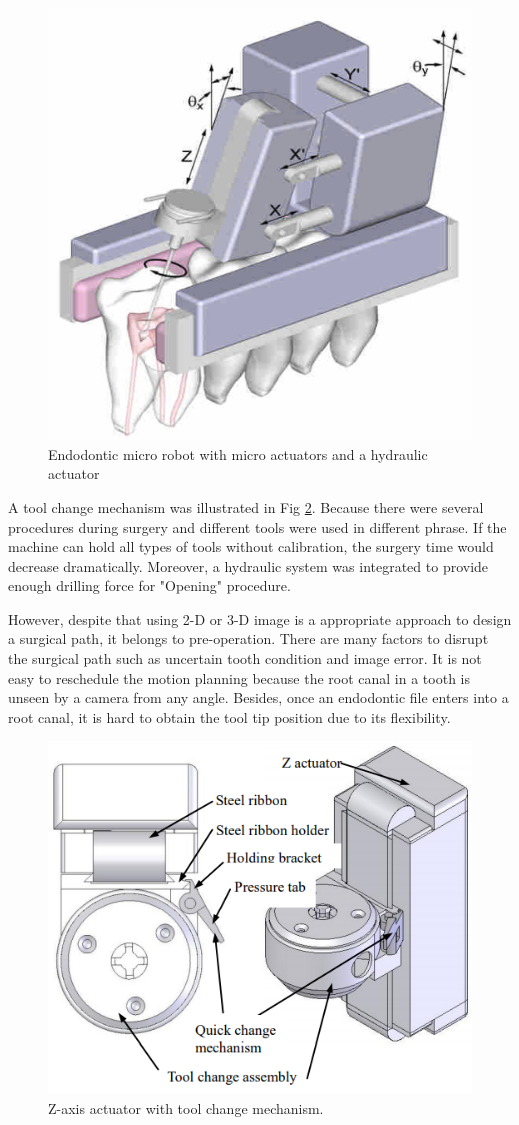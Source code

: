 \begin{figure}[htbp]
\begin{center}
	\includegraphics[width=0.6\linewidth]{Images/NCTU_1.png}
	\caption[Endodontic micro robot with micro actuators, a tool change mechanism, and a hydraulic system]{
Endodontic micro robot with micro actuators and a hydraulic actuator \cite{dong2006wip}
}\label{fig:NCTU_1}
\end{center}
\end{figure}
\par
A tool change mechanism was illustrated in Fig \ref{fig:NCTU_3}. Because there were several procedures during surgery and different tools were used in different phrase. If the machine can hold all types of tools without calibration, the surgery time would decrease dramatically.  Moreover, a hydraulic system was integrated to provide enough drilling force for "Opening" procedure.
\par
However, despite that using 2-D or 3-D image is a appropriate approach to design a surgical path, it belongs to pre-operation. There are many factors to disrupt the surgical path such as uncertain tooth condition and image error. It is not easy to reschedule the motion planning because the root canal in a tooth is unseen by a camera from any angle. Besides, once an endodontic file enters into a root canal, it is hard to obtain the tool tip position due to its flexibility. 
\begin{figure}[htbp]
\begin{center}
\includegraphics[width=0.7\linewidth]{Images/NCTU_3.png}
\caption[Z-axis actuator with tool change mechanism.]{
Z-axis actuator with tool change mechanism. \cite{dong2010design}
}\label{fig:NCTU_3}
\end{center}
\end{figure}